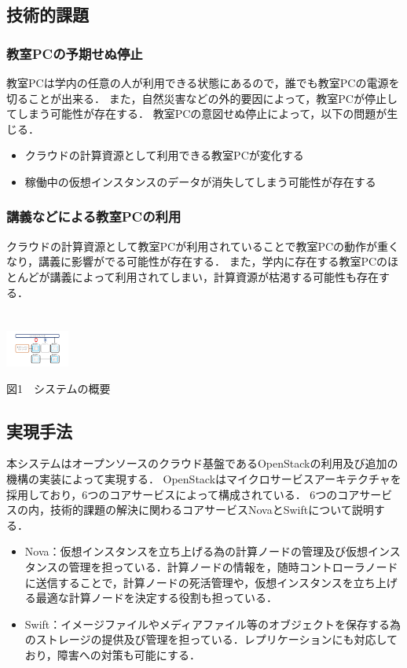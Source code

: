 \documentclass[11pt,a4paper]{jsarticle}
\begin{document}
\subsection{技術的課題}
\subsubsection{教室PCの予期せぬ停止}
教室PCは学内の任意の人が利用できる状態にあるので，誰でも教室PCの電源を切ることが出来る．
また，自然災害などの外的要因によって，教室PCが停止してしまう可能性が存在する．
教室PCの意図せぬ停止によって，以下の問題が生じる．
\begin{itemize}
	\item クラウドの計算資源として利用できる教室PCが変化する
	\item 稼働中の仮想インスタンスのデータが消失してしまう可能性が存在する
\end{itemize}
\subsubsection{講義などによる教室PCの利用}
クラウドの計算資源として教室PCが利用されていることで教室PCの動作が重くなり，講義に影響がでる可能性が存在する．
また，学内に存在する教室PCのほとんどが講義によって利用されてしまい，計算資源が枯渇する可能性も存在する．
\\
\\
\\
\includegraphics[width=2.1cm, bb=0 0 300 400]{graph1.pdf}
\begin{center}図1　システムの概要\end{center}

\subsection{実現手法}
本システムはオープンソースのクラウド基盤であるOpenStack\cite{openstack}の利用及び追加の機構の実装によって実現する．
OpenStackはマイクロサービスアーキテクチャを採用しており，6つのコアサービスによって構成されている．
6つのコアサービスの内，技術的課題の解決に関わるコアサービスNovaとSwiftについて説明する．
\begin{itemize}
	\item Nova：仮想インスタンスを立ち上げる為の計算ノードの管理及び仮想インスタンスの管理を担っている．計算ノードの情報を，随時コントローラノードに送信することで，計算ノードの死活管理や，仮想インスタンスを立ち上げる最適な計算ノードを決定する役割も担っている．
	\item Swift：イメージファイルやメディアファイル等のオブジェクトを保存する為のストレージの提供及び管理を担っている．レプリケーションにも対応しており，障害への対策も可能にする．
\end{itemize}
\end{document}
